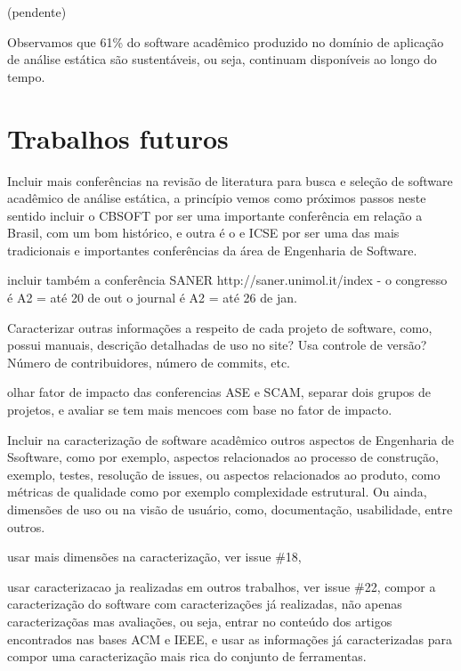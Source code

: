 \label{conclusoes}

(pendente)

Observamos que 61\% do software acadêmico produzido no domínio de aplicação de
análise estática são sustentáveis, ou seja, continuam disponíveis ao longo do
tempo.

\section{Trabalhos futuros}

Incluir mais conferências na revisão de literatura para busca e seleção de
software acadêmico de análise estática, a princípio vemos como próximos passos
neste sentido incluir o CBSOFT por ser uma importante conferência em relação a
Brasil, com um bom histórico, e outra é o e ICSE por ser uma das mais
tradicionais e importantes conferências da área de Engenharia de Software.

incluir também a conferência SANER http://saner.unimol.it/index -
 o congresso é A2 = até 20 de out
 o journal é A2 = até 26 de jan.

Caracterizar outras informações a respeito de cada projeto de software, como,
possui manuais, descrição detalhadas de uso no site? Usa controle de versão?
Número de contribuidores, número de commits, etc.

olhar fator de impacto das conferencias ASE e SCAM, separar dois grupos de
projetos, e avaliar se tem mais mencoes com base no fator de impacto.

Incluir na caracterização de software acadêmico outros aspectos de Engenharia
de Ssoftware, como por exemplo, aspectos relacionados ao processo de
construção, exemplo, testes, resolução de issues, ou aspectos relacionados ao
produto, como métricas de qualidade como por exemplo complexidade estrutural.
Ou ainda, dimensões de uso ou na visão de usuário, como, documentação,
usabilidade, entre outros.


usar mais dimensões na caracterização, ver issue \#18, 

usar caracterizacao ja realizadas em outros trabalhos, ver issue \#22,
compor a caracterização do software com caracterizações já realizadas,
não apenas caracterizaçõas mas avaliações, ou seja, entrar no conteúdo
dos artigos encontrados nas bases ACM e IEEE, e usar as informações
já caracterizadas para compor uma caracterização mais rica
do conjunto de ferramentas.

